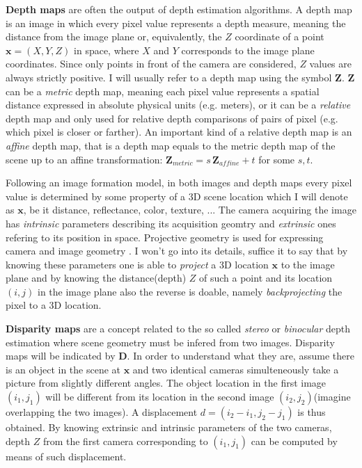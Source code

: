 \textbf{Depth maps} are often the output of depth estimation algorithms.
A depth map is an image in which every pixel value represents a depth measure, meaning the distance from the image plane or, equivalently, the $Z$ coordinate of a point $\mathbf{x} = (X, Y, Z)$ in space, where $X$ and $Y$ corresponds to the image plane coordinates.
Since only points in front of the camera are considered, $Z$ values are always strictly positive.
I will usually refer to a depth map using the symbol $\mathbf{Z}$.
$\mathbf{Z}$ can be a \textit{metric} depth map, meaning each pixel value represents a spatial distance expressed in absolute physical units (e.g. meters), or it can be a \textit{relative} depth map and only used for relative depth comparisons of pairs of pixel (e.g. which pixel is closer or farther).
An important kind of a relative depth map is an \textit{affine} depth map, that is a depth map equals to the metric depth map of the scene up to an affine transformation: $\mathbf{Z}_{metric} = s \, \mathbf{Z}_{affine} + t$ for some $s, t$.

Following an image formation model, in both images and depth maps every pixel value is determined by some property of a 3D scene location which I will denote as $\mathbf{x}$, be it distance, reflectance, color, texture, ...
The camera acquiring the image has \textit{intrinsic} parameters describing its acquisition geomtry and \textit{extrinsic} ones refering to its position in space.
Projective geometry is used for expressing camera and image geometry \cite{multiview}.
I won't go into its details, suffice it to say that by knowing these parameters one is able to \textit{project} a 3D location $\mathbf{x}$ to the image plane and by knowing the distance(depth) $Z$ of such a point and its location $(i,j)$ in the image plane also the reverse is doable, namely \textit{backprojecting} the pixel to a 3D location.


\textbf{Disparity maps} are a concept related to the so called \textit{stereo} or \textit{binocular} depth estimation where scene geometry must be infered from two images.
Disparity maps will be indicated by $\mathbf{D}$. In order to understand what they are, assume there is an object in the scene at $\mathbf{x}$ and two identical cameras simulteneously take a picture from slightly different angles.
The object location in the first image $(i_{1}, j_{1})$ will be different from its location in the second image $(i_{2}, j_{2}) $(imagine overlapping the two images).
A displacement $d = (i_{2} - i_{1}, j_{2} - j_{1})$ is thus obtained.
By knowing extrinsic and intrinsic parameters of the two cameras, depth $Z$ from the first camera corresponding to $(i_{1}, j_{1})$ can be computed by means of such displacement.

